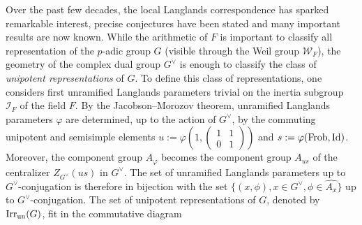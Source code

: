 
Over the past few decades, the local Langlands correspondence has sparked remarkable interest, precise conjectures have been stated and many important results are now known. While the arithmetic of $F$ is important to classify all representation of the $p$-adic group $G$ (visible through the Weil group $\mathcal{W}_F$), the geometry of the complex dual group $G^\vee$ is enough to classify the class of \textit{unipotent representations} of $G$. To define this class of representations, one considers first unramified Langlands parameters trivial on the inertia subgroup $\mathcal{I}_F$ of the field $F$. By the Jacobson--Morozov theorem, unramified Langlands parameters $\varphi$ are determined, up to the action of $G^\vee$, by the commuting unipotent and semisimple elements $u:=\varphi(1,\left(\begin{smallmatrix}
    1 & 1\\
    0 & 1
\end{smallmatrix}\right))$ and $s:=\varphi(\mathrm{Frob},\mathrm{Id})$. Moreover, the component group $A_{\varphi}$ becomes the component group $A_{us}$ of the centralizer $Z_{G^\vee}(us)$ in $G^\vee$. The set of unramified Langlands parameters up to $G^\vee$-conjugation is therefore in bijection with the set $\{(x,\phi),x\in G^\vee,\phi\in\widehat{A_x}\}$ up to $G^\vee$-conjugation. The set of unipotent representations of $G$, denoted by $\mathrm{Irr}_{\mathrm{un}}(G)$, fit in the commutative diagram 

